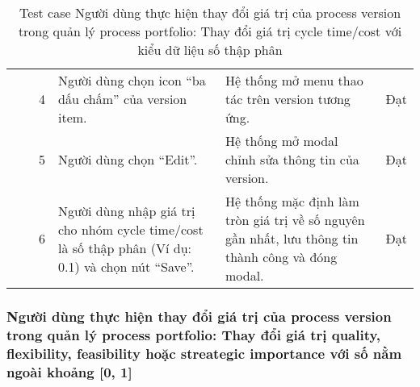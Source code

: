 \begin{table}[H]
{\begin{tabular}{|p{3cm}|p{1.5cm}|p{0.5cm}|p{4cm}|p{4cm}|>{\centering\arraybackslash}p{1cm}|}
            &
            &
            \multicolumn{1}{c|}{4} &
            Người dùng chọn icon “ba dấu chấm” của version item. &
            Hệ thống mở menu thao tác trên version tương ứng. &
            Đạt \\ \cline{3-6} 
            &
            &
            \multicolumn{1}{c|}{5} &
            Người dùng chọn “Edit”. &
            Hệ thống mở modal chỉnh sửa thông tin của version. &
            Đạt \\ \cline{3-6} 
            &
            &
            \multicolumn{1}{c|}{6} &
            Người dùng nhập giá trị cho nhóm cycle time/cost là số thập phân (Ví dụ: 0.1) và chọn nút “Save”. &
            Hệ thống mặc định làm tròn giá trị về số nguyên gần nhất, lưu thông tin thành công và đóng modal. &
            Đạt \\ \cline{3-6} \hline
        \end{tabular}
    }
    \caption{Test case Người dùng thực hiện thay đổi giá trị của process version trong quản lý process portfolio: Thay đổi giá trị cycle time/cost với kiểu dữ liệu số thập phân}
\end{table}

\subsubsection{Người dùng thực hiện thay đổi giá trị của process version trong quản lý process portfolio: Thay đổi giá trị quality, flexibility, feasibility hoặc streategic importance với số nằm ngoài khoảng [0, 1]}

